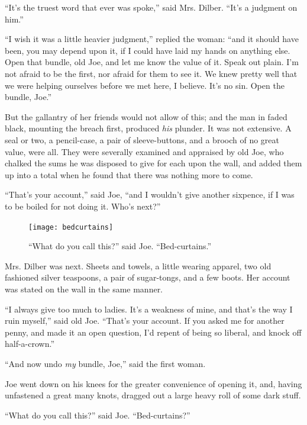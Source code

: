 \documentclass[paper=5.5in:8.5in,BCOR=15mm,twoside,DIV=15,headinclude=off,12pt,chapterprefix=off,openany,headings=huge]{scrbook} %
\begin{document}
\enquote{It's the truest word that ever was spoke,} said Mrs. Dilber. \enquote{It's a judgment on him.}

\enquote{I wish it was a little heavier judgment,} replied the woman: \enquote{and it should have been, you may depend upon it, if I could have laid my hands on anything else. Open that bundle, old Joe, and let me know the value of it. Speak out plain. I'm not afraid to be the first, nor afraid for them to see it. We knew pretty well that we were helping ourselves before we met here, I believe. It's no sin. Open the bundle, Joe.}

But the gallantry of her friends would not allow of this; and the man in faded black, mounting the breach first, produced \textit{his} plunder. It was not extensive. A seal or two, a pencil-case, a pair of sleeve-buttons, and a brooch of no great value, were all. They were severally examined and appraised by old Joe, who chalked the sums he was disposed to give for each upon the wall, and added them up into a total when he found that there was nothing more to come.

\enquote{That's your account,} said Joe, \enquote{and I wouldn't give another sixpence, if I was to be boiled for not doing it. Who's next?}

\begin{figure}[p]
\begin{minipage}[c]{\linewidth}
\texttt{[image: bedcurtains]}
\caption*{\enquote{What do you call this?} said Joe. \enquote{Bed-curtains.}}
\end{minipage}
\end{figure}

Mrs. Dilber was next. Sheets and towels, a little wearing apparel, two old fashioned silver teaspoons, a pair of sugar-tongs, and a few boots. Her account was stated on the wall in the same manner.

\enquote{I always give too much to ladies. It's a weakness of mine, and that's the way I ruin myself,} said old Joe. \enquote{That's your account. If you asked me for another penny, and made it an open question, I'd repent of being so liberal, and knock off half-a-crown.}

\enquote{And now undo \textit{my} bundle, Joe,} said the first woman.

Joe went down on his knees for the greater convenience of opening it, and, having unfastened a great many knots, dragged out a large heavy roll of some dark stuff.

\enquote{What do you call this?} said Joe. \enquote{Bed-curtains?}
\end{document}
